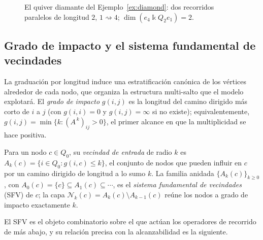 \documentclass[runningheads]{llncs}
\newcommand{\kk}{\Bbbk}
\newcommand{\kQ}{\kk Q}
\newcommand{\Adj}{A}
\newcommand{\walk}{\rightsquigarrow}
\begin{document}
\begin{figure}[t]
\centering
{}
\caption{El quiver diamante del Ejemplo~\ref{ex:diamond}: dos recorridos
paralelos de longitud $2$, $1\walk4$; $\dim(e_4\kQ_2 e_1)=2$.}
\label{fig:diamond}
\end{figure}

\subsection{Grado de impacto y el sistema fundamental de vecindades}
\label{sec:sfv}

La graduación por longitud induce una estratificación canónica de los vértices
alrededor de cada nodo, que organiza la estructura multi-salto que el modelo
explotará. El \emph{grado de impacto} $g(i,j)$ es la longitud del camino
dirigido más corto de $i$ a $j$ (con $g(i,i)=0$ y $g(i,j)=\infty$ si no
existe); equivalentemente, $g(i,j)=\min\{k:(\Adj^{\,k})_{ij}>0\}$, el primer
alcance en que la multiplicidad se hace positiva.

\begin{definition}\label{def:sfv}
Para un nodo $c\in Q_0$, su \emph{vecindad de entrada} de radio $k$ es
$A_k(c)=\{i\in Q_0: g(i,c)\le k\}$, el conjunto de nodos que pueden influir en
$c$ por un camino dirigido de longitud a lo sumo $k$. La familia anidada
$\{A_k(c)\}_{k\ge0}$, con $A_0(c)=\{c\}\subseteq A_1(c)\subseteq\cdots$, es el
\emph{sistema fundamental de vecindades} (SFV) de $c$; la capa
$\mathcal{N}_k(c)=A_k(c)\setminus A_{k-1}(c)$ reúne los nodos a grado de
impacto exactamente $k$.
\end{definition}

El SFV es el objeto combinatorio sobre el que actúan los operadores de
recorrido de más abajo, y su relación precisa con la alcanzabilidad es la
siguiente.
\end{document}
